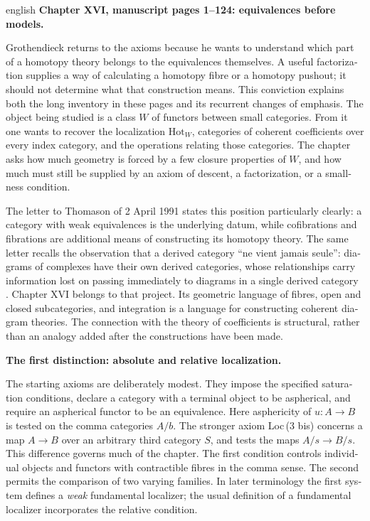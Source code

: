 \begin{otherlanguage}{english}
\begin{otherlanguage*}{english}
\noindent\textbf{Chapter XVI, manuscript pages 1--124: equivalences before models.}

Grothendieck returns to the axioms because he wants to understand which part of a homotopy theory belongs to the equivalences themselves. A useful factorization supplies a way of calculating a homotopy fibre or a homotopy pushout; it should not determine what that construction means. This conviction explains both the long inventory in these pages and its recurrent changes of emphasis. The object being studied is a class $W$ of functors between small categories. From it one wants to recover the localization $\mathrm{Hot}_W$, categories of coherent coefficients over every index category, and the operations relating those categories. The chapter asks how much geometry is forced by a few closure properties of $W$, and how much must still be supplied by an axiom of descent, a factorization, or a smallness condition.

The letter to Thomason of 2 April 1991 states this position particularly clearly: a category with weak equivalences is the underlying datum, while cofibrations and fibrations are additional means of constructing its homotopy theory. The same letter recalls the observation that a derived category ``ne vient jamais seule'': diagrams of complexes have their own derived categories, whose relationships carry information lost on passing immediately to diagrams in a single derived category \citep[\S\S1--2]{Grothendieck1991Letter}. Chapter XVI belongs to that project. Its geometric language of fibres, open and closed subcategories, and integration is a language for constructing coherent diagram theories. The connection with the theory of coefficients is structural, rather than an analogy added after the constructions have been made.

\medskip\noindent\textbf{The first distinction: absolute and relative localization.}

The starting axioms are deliberately modest. They impose the specified saturation conditions, declare a category with a terminal object to be aspherical, and require an aspherical functor to be an equivalence. Here asphericity of $u:A\to B$ is tested on the comma categories $A/b$. The stronger axiom Loc\,(3 bis) concerns a map $A\to B$ over an arbitrary third category $S$, and tests the maps $A/s\to B/s$. This difference governs much of the chapter. The first condition controls individual objects and functors with contractible fibres in the comma sense. The second permits the comparison of two varying families. In later terminology the first system defines a \emph{weak} fundamental localizer; the usual definition of a fundamental localizer incorporates the relative condition.


\end{otherlanguage*}
\end{otherlanguage}
